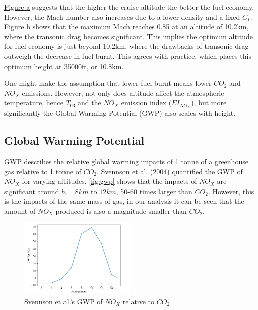 \documentclass[12pt, a4paper]{article}
\begin{document}
\hyperref[fig:hfuel]{Figure \thefigure a} suggests that the higher the cruise altitude the better the fuel economy. However, the Mach number also increases due to a lower density and a fixed $C_L$. \hyperref[fig:hfuel]{Figure \thefigure b} shows that the maximum Mach reaches 0.85 at an altitude of 10.2km, where the transonic drag becomes significant. This implies the optimum altitude for fuel economy is just beyond 10.2km, where the drawbacks of transonic drag outweigh the decrease in fuel burnt. This agrees with practice, which places this optimum height at 35000ft, or 10.8km. 

One might make the assumption that lower fuel burnt means lower $CO_2$ and $NO_X$ emissions. However, not only does altitude affect the atmospheric temperature, hence $T_{03}$ and the $NO_X$ emission index ($EI_{NO_X}$), but more significantly the Global Warming Potential (GWP) also scales with height.

\subsection{Global Warming Potential}
GWP describes the relative global warming impacts of 1 tonne of a greenhouse gas relative to 1 tonne of $CO_2$. Svennson et al. (2004) quantified the GWP of $NO_X$ for varying altitudes. \autoref{fig:gwp} shows that the impacts of $NO_X$ are significant around $h=8km$ to $12km$, 50-60 times larger than $CO_2$. However, this is the impacts of the same mass of gas, in our analysis it can be seen that the amount of $NO_X$ produced is also a magnitude smaller than $CO_2$.
\begin{figure}
	\centering
	\includegraphics[width=0.5\textwidth]{../Plots/GWP svensonn}
	\caption{Svennson et al.'s GWP of $NO_X$ relative to $CO_2$}
	\label{fig:gwp}
\end{figure} 
\end{document}
